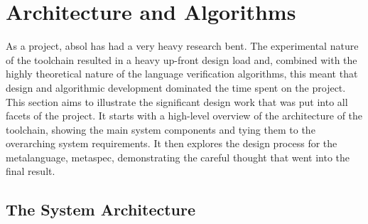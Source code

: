 \chapter{Architecture and Algorithms} %
\label{cha:architecture_and_algorithms}

As a project, \gls{absol} has had a very heavy research bent. 
The experimental nature of the toolchain resulted in a heavy up-front design load and, combined with the highly theoretical nature of the language verification algorithms, this meant that design and algorithmic development dominated the time spent on the project.\\

This section aims to illustrate the significant design work that was put into all facets of the project.
It starts with a high-level overview of the architecture of the toolchain, showing the main system components and tying them to the overarching system requirements.
It then explores the design process for the metalanguage, \gls{metaspec}, demonstrating the careful thought that went into the final result. 

\section{The System Architecture} %
\label{sec:the_system_architecture}

